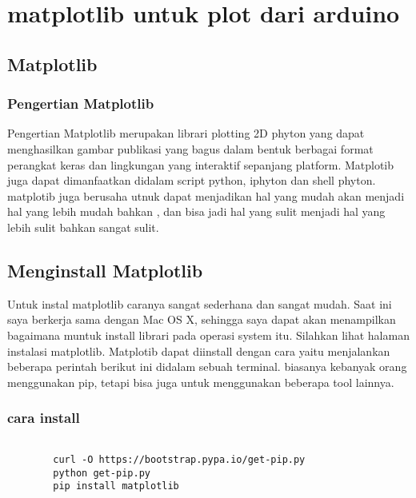 
\section {matplotlib untuk plot dari arduino}

\subsection {Matplotlib}
\subsubsection {Pengertian Matplotlib}
	Pengertian Matplotlib merupakan librari plotting 2D phyton yang dapat menghasilkan gambar publikasi yang bagus dalam bentuk berbagai format perangkat keras dan lingkungan yang interaktif sepanjang platform. Matplotib juga dapat dimanfaatkan didalam script python, iphyton dan shell phyton. matplotib juga berusaha utnuk dapat menjadikan hal yang mudah akan menjadi hal yang lebih mudah bahkan , dan bisa jadi hal yang sulit menjadi hal yang lebih sulit bahkan sangat sulit.
	
\subsection {Menginstall Matplotlib}
	Untuk instal matplotlib caranya sangat sederhana dan sangat mudah. Saat ini saya berkerja sama dengan Mac OS X, sehingga saya dapat akan menampilkan bagaimana muntuk install librari pada operasi system itu. Silahkan lihat halaman instalasi matplotlib.	Matplotib dapat diinstall dengan cara yaitu menjalankan beberapa perintah berikut ini didalam sebuah terminal. biasanya kebanyak orang menggunakan pip, tetapi bisa juga untuk menggunakan beberapa tool lainnya.

	\subsubsection{cara install}
	\begin{verbatim} 
	
		curl -O https://bootstrap.pypa.io/get-pip.py
		python get-pip.py
		pip install matplotlib

	\end{verbatim}
	
